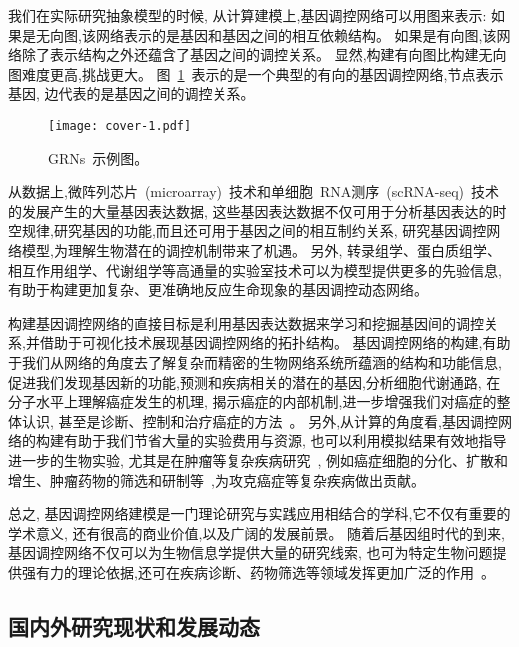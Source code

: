 我们在实际研究抽象模型的时候, 从计算建模上,基因调控网络可以用图来表示:
如果是无向图,该网络表示的是基因和基因之间的相互依赖结构。
如果是有向图,该网络除了表示结构之外还蕴含了基因之间的调控关系。
显然,构建有向图比构建无向图难度更高,挑战更大。
图~\ref{cover-1}~表示的是一个典型的有向的基因调控网络,节点表示基因, 边代表的是基因之间的调控关系。
\begin{figure}[!htbp]
    \centering
    \texttt{[image: cover-1.pdf]}
    \caption{GRNs~示例图。}
    \label{cover-1}
\end{figure}

从数据上,微阵列芯片~(microarray)~技术和单细胞~RNA测序~(scRNA-seq)~技术的发展产生的大量基因表达数据,
这些基因表达数据不仅可用于分析基因表达的时空规律,研究基因的功能,而且还可用于基因之间的相互制约关系,
研究基因调控网络模型,为理解生物潜在的调控机制带来了机遇。
另外, 转录组学、蛋白质组学、相互作用组学、代谢组学等高通量的实验室技术可以为模型提供更多的先验信息,
有助于构建更加复杂、更准确地反应生命现象的基因调控动态网络。

构建基因调控网络的直接目标是利用基因表达数据来学习和挖掘基因间的调控关系,并借助于可视化技术展现基因调控网络的拓扑结构。
基因调控网络的构建,有助于我们从网络的角度去了解复杂而精密的生物网络系统所蕴涵的结构和功能信息,
促进我们发现基因新的功能,预测和疾病相关的潜在的基因\cite{lee2009computational},分析细胞代谢通路,
在分子水平上理解癌症发生的机理,
揭示癌症的内部机制,进一步增强我们对癌症的整体认识,
甚至是诊断、控制和治疗癌症的方法~\cite{kreeger2009cancer,yan2016biological}。
另外,从计算的角度看,基因调控网络的构建有助于我们节省大量的实验费用与资源,
也可以利用模拟结果有效地指导进一步的生物实验,
尤其是在肿瘤等复杂疾病研究~\cite{boyle2017expanded},
例如癌症细胞的分化、扩散和增生、肿瘤药物的筛选和研制等~\cite{hurley2011gene},为攻克癌症等复杂疾病做出贡献。

总之, 基因调控网络建模是一门理论研究与实践应用相结合的学科,它不仅有重要的学术意义,
还有很高的商业价值,以及广阔的发展前景。
随着后基因组时代的到来,基因调控网络不仅可以为生物信息学提供大量的研究线索,
也可为特定生物问题提供强有力的理论依据,还可在疾病诊断、药物筛选等领域发挥更加广泛的作用~\cite{kreeger2009cancer}。

\subsection{国内外研究现状和发展动态}

